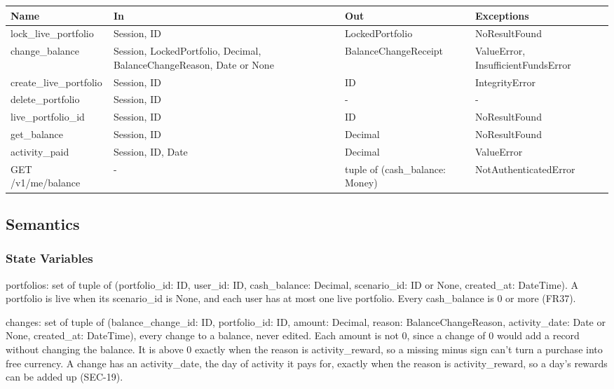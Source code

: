 \documentclass[12pt, titlepage]{article}
\begin{document}
\begin{center}
\small
\setlength{\tabcolsep}{3pt}
\begin{tabular}{>{\raggedright\arraybackslash}p{3.4cm}
  >{\raggedright\arraybackslash}p{3.9cm}
  >{\raggedright\arraybackslash}p{3.95cm}
  >{\raggedright\arraybackslash}p{4.0cm}}
\toprule
\textbf{Name} & \textbf{In} & \textbf{Out} & \textbf{Exceptions} \\
\midrule
lock\_live\_portfolio & Session, ID & LockedPortfolio & NoResultFound \\
change\_balance & Session, LockedPortfolio, Decimal, BalanceChangeReason, Date
or None & BalanceChangeReceipt & ValueError, InsufficientFundsError \\
create\_live\_portfolio & Session, ID & ID & IntegrityError \\
delete\_portfolio & Session, ID & - & - \\
live\_portfolio\_id & Session, ID & ID & NoResultFound \\
get\_balance & Session, ID & Decimal & NoResultFound \\
activity\_paid & Session, ID, Date & Decimal & ValueError \\
GET /v1/me/balance & - & tuple of (cash\_balance: Money) &
NotAuthenticatedError \\
\bottomrule
\end{tabular}
\end{center}

\subsection{Semantics}

\subsubsection{State Variables}

\noindent portfolios: set of tuple of (portfolio\_id: ID, user\_id: ID,
cash\_balance: Decimal, scenario\_id: ID or None, created\_at: DateTime). A
portfolio is live when its scenario\_id is None, and each user has at most one
live portfolio. Every cash\_balance is 0 or more (FR37).

\medskip
\noindent changes: set of tuple of (balance\_change\_id: ID, portfolio\_id: ID,
amount: Decimal, reason: BalanceChangeReason, activity\_date: Date or None,
created\_at: DateTime), every change to a balance, never edited. Each amount is
not 0, since a change of 0 would add a record without changing the balance. It
is above 0 exactly when the reason is activity\_reward, so a missing
minus sign can't turn a purchase into free currency. A change has an
activity\_date, the day of activity it pays for, exactly when the reason is
activity\_reward, so a day's rewards can be added up (SEC-19).
\end{document}
